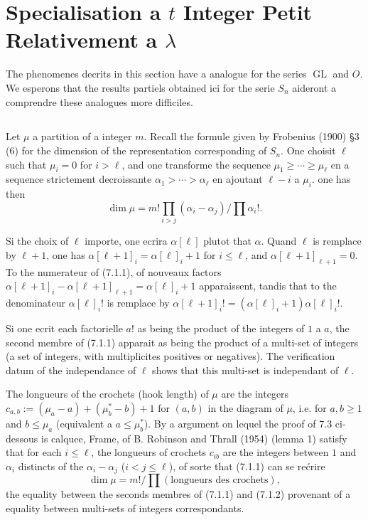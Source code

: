 \documentclass[11pt,a4paper]{article}
\theoremstyle{plain}
\theoremstyle{definition}
\DeclareMathOperator{\GL}{GL}
\begin{document}
\section{Specialisation a $t$ Integer Petit Relativement a $\lambda$}

The phenomenes decrits in this section have a analogue for the series $\GL$ and $O$. We esperons that the results partiels obtained ici for the serie $S_n$ aideront a comprendre these analogues more difficiles.

\subsection{}
Let $\mu$ a partition of a integer $m$. Recall the formule given by Frobenius (1900) \S 3 (6) for the dimension of the representation corresponding of $S_n$. One choisit $\ell$ such that $\mu_i = 0$ for $i > \ell$, and one transforme the sequence $\mu_1 \geq \cdots \geq \mu_\ell$ en a sequence strictement decroissante $\alpha_1 > \cdots > \alpha_\ell$ en ajoutant $\ell - i$ a $\mu_i$. one has then
\begin{equation}
\dim \mu = m! \prod_{i > j} (\alpha_i - \alpha_j) \big/ \prod \alpha_i!. \tag{7.1.1}
\end{equation}

Si the choix of $\ell$ importe, one ecrira $\alpha[\ell]$ plutot that $\alpha$. Quand $\ell$ is remplace by $\ell + 1$, one has $\alpha[\ell+1]_i = \alpha[\ell]_i + 1$ for $i \leq \ell$, and $\alpha[\ell+1]_{\ell+1} = 0$. To the numerateur of (7.1.1), of nouveaux factors $\alpha[\ell+1]_i - \alpha[\ell+1]_{\ell+1} = \alpha[\ell]_i + 1$ apparaissent, tandis that to the denominateur $\alpha[\ell]_i!$ is remplace by $\alpha[\ell+1]_i! = (\alpha[\ell]_i + 1)\alpha[\ell]_i!$.

Si one ecrit each factorielle $a!$ as being the product of the integers of $1$ a $a$, the second membre of (7.1.1) apparait as being the product of a multi-set of integers (a set of integers, with multiplicites positives or negatives). The verification datum of the independance of $\ell$ shows that this multi-set is independant of $\ell$.

The longueurs of the crochets (hook length) of $\mu$ are the integers $c_{a,b} := (\mu_a - a) + (\mu^*_b - b) + 1$ for $(a, b)$ in the diagram of $\mu$, i.e. for $a, b \geq 1$ and $b \leq \mu_a$ (equivalent a $a \leq \mu^*_b$). By a argument on lequel the proof of 7.3 ci-dessous is calquee, Frame, of B. Robinson and Thrall (1954) (lemma 1) satisfy that for each $i \leq \ell$, the longueurs of crochets $c_{ib}$ are the integers between $1$ and $\alpha_i$ distincts of the $\alpha_i - \alpha_j$ ($i < j \leq \ell$), of sorte that (7.1.1) can se re\'crire
\begin{equation}
\dim \mu = m! / \prod (\text{longueurs des crochets}), \tag{7.1.2}
\end{equation}
the equality between the seconds membres of (7.1.1) and (7.1.2) provenant of a equality between multi-sets of integers correspondants.
\end{document}
